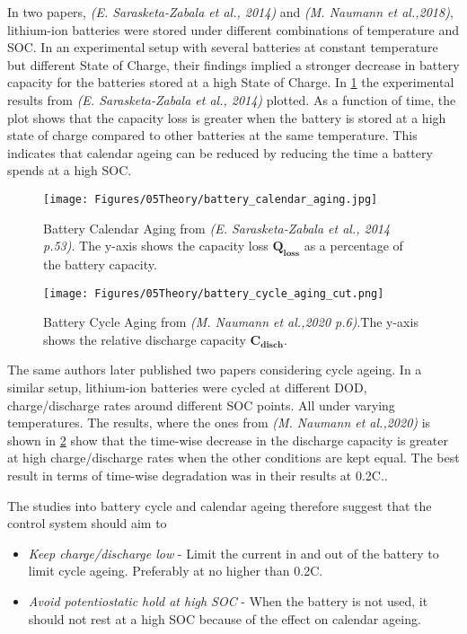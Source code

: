 In two papers, \textit{(E. Sarasketa-Zabala et al., 2014)} and \textit{(M. Naumann et al.,2018)}, lithium-ion batteries were stored under different combinations of temperature and SOC. In an experimental setup with several batteries at constant temperature but different State of Charge, their findings implied a stronger decrease in battery capacity for the  batteries stored at a high State of Charge. \cite{NAUMANN2018153} In \ref{fig:battery_calendar_aging} the experimental results from \textit{(E. Sarasketa-Zabala et al., 2014)} plotted. As a function of time, the plot shows that the capacity loss is greater when the battery is stored at a high state of charge compared to other batteries at the same temperature.\cite{SARASKETAZABALA201445}  This indicates that calendar ageing can be reduced by reducing the time a battery spends at a high SOC.\\

\begin{figure}
    \centering
    \texttt{[image: Figures/05Theory/battery\_calendar\_aging.jpg]}
    \caption[Battery Calendar Aging]{Battery Calendar Aging from \textit{(E. Sarasketa-Zabala et al., 2014 p.53)}\cite{SARASKETAZABALA201445}. The y-axis shows the capacity loss $\mathbf{Q_{loss}}$ as a percentage of the battery capacity.}
    \label{fig:battery_calendar_aging}
\end{figure}

\begin{figure}
    \centering
    \texttt{[image: Figures/05Theory/battery\_cycle\_aging\_cut.png]}
    \caption[Battery Cycle Aging]{Battery Cycle Aging from \textit{(M. Naumann et al.,2020 p.6)}\cite{NAUMANN2020227666}.The y-axis shows the relative discharge capacity $\mathbf{C_{disch}}$.}
    \label{fig:battery_cycle_aging_cut}
\end{figure}

The same authors later published two papers considering cycle ageing. In a similar setup, lithium-ion batteries were cycled at different DOD, charge/discharge rates around different SOC points. All under varying temperatures. The results, where the ones from \textit{(M. Naumann et al.,2020)} is shown in \ref{fig:battery_cycle_aging_cut} show that the time-wise decrease in the discharge capacity is greater at high charge/discharge rates when the other conditions are kept equal. The best result in terms of time-wise degradation was in their results at 0.2C.\cite{SARASKETAZABALA2015573}\cite{NAUMANN2020227666}. 

The studies into battery cycle and calendar ageing therefore suggest that the control system should aim to 
\begin{itemize}
    \item \textit{Keep charge/discharge low}    -   Limit the current in and out of the battery to limit cycle ageing. Preferably at no higher than 0.2C.
    \item \textit{Avoid potentiostatic hold at high SOC}    -   When the battery is not used, it should not rest at a high SOC because of the effect on calendar ageing. 
\end{itemize}